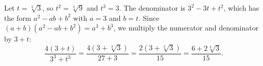 Let $t=\sqrt[3]3$, so $t^2=\sqrt[3]9$ and $t^3=3$. The denominator is $3^2-3t+t^2$, which has the form $a^2-ab+b^2$ with $a=3$ and $b=t$. Since $(a+b)\left(a^2-ab+b^2\right)=a^3+b^3$, we multiply the numerator and denominator by $3+t$:
\[\dfrac{4(3+t)}{3^3+t^3}=\dfrac{4\left(3+\sqrt[3]3\right)}{27+3}=\dfrac{2\left(3+\sqrt[3]3\right)}{15}=\boxed{\dfrac{6+2\sqrt[3]3}{15}}.\]
